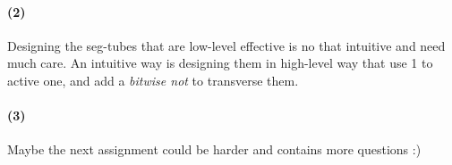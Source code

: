 \documentclass[onecolumn, oneside, ctexart]{SUSTechHomework}
\begin{document}
\paragraph{(2)} Designing the seg-tubes that are low-level effective is no that intuitive and need much care. An intuitive way is designing them in high-level way that use 1 to active one, and add a \emph{bitwise not} to transverse them.
\vspace{-1em}
\paragraph{(3)} Maybe the next assignment could be harder and contains more questions :)
\end{document}
